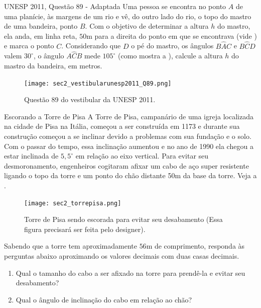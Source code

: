 \begin{task}{UNESP 2011, Questão 89 - Adaptada}
Uma pessoa se encontra no ponto $A$ de uma planície, às margens de um rio e vê, do outro lado do rio, o topo do mastro de uma bandeira, ponto $B$. Com o objetivo de determinar a altura $h$ do mastro, ela anda, em linha reta, $50$m para a direita do ponto em que se encontrava (vide ) e marca o ponto $C$. Considerando que $D$ o pé do mastro, os ângulos $B\hat{A}C$ e $B\hat{C}D$ valem $30^\circ$, o ângulo $A\hat{C}B$  mede $105^\circ$ (como mostra a  ), calcule a altura $h$ do mastro da bandeira, em metros.
\begin{figure}[H]
    \centering
    \texttt{[image: sec2\_vestibularunesp2011\_Q89.png]}
    \caption{Questão 89 do vestibular da UNESP 2011. }
    \label{sec2_leidossenos_atunesp2}
\end{figure}
\end{task}

\begin{task}{Escorando a Torre de Pisa}
A Torre de Pisa, campanário de uma igreja localizada na cidade de Pisa na Itália, começou a ser construída em 1173 e durante sua construção começou a se inclinar devido a problemas com sua fundação e o solo. 
%
Com o passar do tempo, essa inclinação aumentou e no ano de 1990 ela chegou a estar inclinada de $5,5^\circ$ em relação ao eixo vertical. 
%
Para evitar seu desmoronamento, engenheiros cogitaram afixar um cabo de aço super resistente ligando o topo da torre e um ponto do chão distante 50m da base da torre. 
%
Veja a . 

\begin{figure}[H]
    \centering
    \texttt{[image: sec2\_torrepisa.png]}
    \caption{Torre de Pisa sendo escorada para evitar seu desabamento (Essa figura precisará ser feita pelo designer).
    }
    \label{sec2_leidossenos_attorrepisa}
\end{figure}


Sabendo que a torre tem aproximadamente $56$m de comprimento, responda às perguntas abaixo aproximando os valores decimais com duas casas decimais.
\begin{enumerate}
    \item{}
    Qual o tamanho do cabo a ser afixado na torre para prendê-la e evitar seu desabamento?
    
    \item{} 
    Qual o ângulo de inclinação do cabo em relação ao chão?
\end{enumerate}
\end{task}

